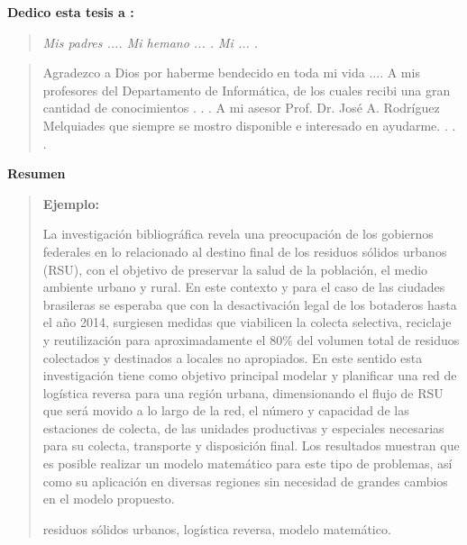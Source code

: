 
 {\bf\Large {Dedico esta tesis a :}}
 \vskip 1cm
\begin{quotation}
{\it Mis padres ....
\vskip 1cm
Mi hemano ... .
\vskip 1cm
Mi ... .}
\end{quotation}


\newpage

 {\bf\Large {}}
 \vskip 1.5cm
\begin{quotation}
Agradezco a Dios por haberme bendecido en toda mi vida ....
{\vskip 1cm}
A mis profesores del Departamento de Informática, de los cuales recibi una gran cantidad de conocimientos  . . .
\vskip 1cm
A mi asesor Prof. Dr. José A. Rodríguez Melquiades que siempre se mostro disponible e interesado en ayudarme.
\vskip 1cm
 . . .
 \end{quotation}


\newpage
\begin{center}
 {\bf\LARGE Resumen}
\end{center} 
\vskip 0.5cm
\begin{quotation}
{\bf Ejemplo:}\par

La investigación bibliográfica revela una preocupación de los gobiernos federales en lo relacionado al destino final de los residuos sólidos urbanos (RSU), con el objetivo de preservar la salud de la población, el medio ambiente urbano y rural. En este contexto y para el caso de las ciudades brasileras se esperaba que con la desactivación legal de los botaderos hasta el año 2014, surgiesen medidas que viabilicen la colecta selectiva, reciclaje y reutilización para aproximadamente el $80\%$ del volumen total de residuos colectados y destinados a locales no apropiados. 
\vskip 0.2cm 
En este sentido esta investigación tiene como objetivo principal modelar y planificar una red de logística reversa para una región urbana, dimensionando el flujo de RSU que será movido a lo largo de la red, el número y capacidad de las estaciones de colecta, de las unidades productivas y especiales necesarias para su colecta, transporte y disposición final. Los resultados muestran que es posible realizar un modelo matemático para este tipo de problemas, así como su aplicación en diversas regiones sin necesidad de grandes cambios en el modelo propuesto.    

\vskip 0.3cm
\hspace*{-0.6cm}{\bf Palabras claves:} residuos sólidos urbanos, logística reversa, modelo matemático.
\end{quotation}


